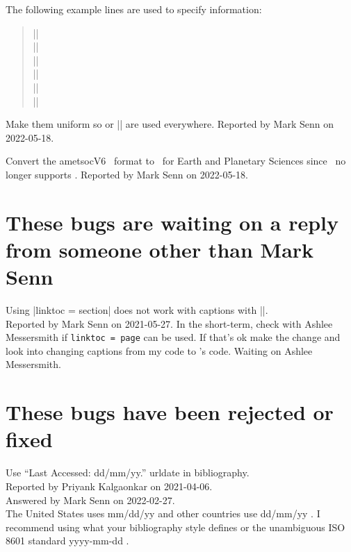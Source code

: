 {
The following example lines are used to specify information:
\begin{quote}
|\def\ZZinstitution{Purdue University}|\\
|\def\ZZcampus{West\space Lafayette}|\\
|\def\ZZprogram{Electrical and Computer Engineering}|\\
|\def\ZZdegree{Doctor of Philosophy}|\\
|\def\ZZdocument{A Dissertation}|\\
|\def\ZZgraduation{May 2022}|\\
\end{quote}
\vspace*{-16pt}
Make them uniform so 
or |\space| are used everywhere.
Reported by Mark Senn on 2022-05-18.

Convert the ametsocV6 \BibTeXLogo\ format
to \BibLaTeXLogo\ for Earth and Planetary Sciences
since \PurdueThesisLogo\ no longer supports \BibTeXLogo.
Reported by Mark Senn on 2022-05-18.


\section{These bugs are waiting on a reply from someone other than Mark Senn}

Using
|linktoc = section|
does not work with captions with
|\frac|.\\
Reported by Mark Senn on 2021-05-27.
In the short-term,
check with Ashlee Messersmith
if {\tt linktoc = page} can be used.
If that's ok make the change
and look into changing captions from my code
to \LaTeXLogo's code.
Waiting on Ashlee Messersmith.


\section{These bugs have been rejected or fixed}

Use ``Last Accessed: dd/mm/yy.'' urldate in bibliography.\\
Reported by Priyank Kalgaonkar on 2021-04-06.\\
Answered by Mark Senn on 2022-02-27.\\
The United States uses mm/dd/yy and other countries use dd/mm/yy
\cite{cms17-ambiguous-dates}.
I recommend using what your bibliography style defines
or the unambiguous ISO 8601 standard yyyy-mm-dd
\cite{cms17-iso-dates}.

}
